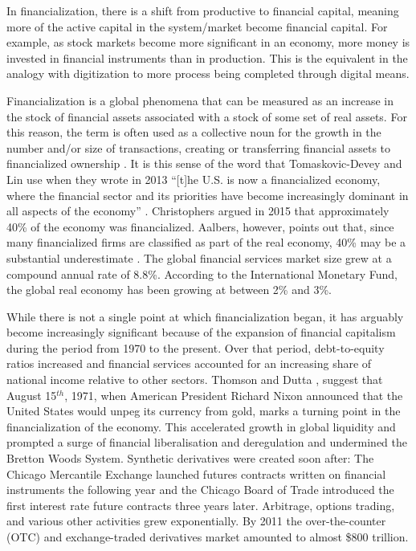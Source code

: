 In financialization, there is a shift from productive to financial capital, meaning more of the active capital in the system/market become financial capital. 
For example, as stock markets become more significant in an economy, more money is invested in financial instruments than in production. This is the equivalent in the analogy with digitization to more process being completed through digital means. 


Financialization is a global phenomena that can be measured as an increase in the stock of financial assets associated with a stock of some set of real assets. For this reason, the term is often used as a collective noun for the growth in the number and/or size of transactions, creating or transferring financial assets to financialized ownership \cite{GET_financialization-numberOfTransactions}. %
It is this sense of the word that Tomaskovic-Devey and Lin use when they wrote in 2013 ``[t]he U.S. is now a financialized economy, where the financial sector and its priorities have become increasingly dominant in all aspects of the economy'' \cite{tomaskovic-deveyFinancializationCausesInequality2013}. Christophers argued in 2015 that approximately 40\% of the economy was financialized. Aalbers, however, points out that, since many financialized firms are classified as part of the real economy, 40\% may be a substantial underestimate \cite{aalbersPotentialFinancialization2015}.  The global financial services market size grew at a compound annual rate of 8.8\%. According to the International Monetary Fund,  the global real economy has been growing at between 2\% and 3\%.

While there is not a single point at which financialization began, it has arguably become increasingly significant because of the expansion of financial capitalism during the period from 1970 to the present. Over that period,  debt-to-equity ratios increased and financial services accounted for an increasing share of national income relative to other sectors. Thomson and Dutta \cite{thomsonFinancialisationPrimer2018}, suggest that August 15$^{th}$, 1971, when American President Richard Nixon announced that the United States would unpeg its currency from gold, marks a turning point in the financialization of the economy. This accelerated growth in global liquidity and prompted a surge of financial liberalisation and deregulation and undermined the Bretton Woods System. Synthetic derivatives were created soon after: The Chicago Mercantile Exchange launched futures contracts written on financial instruments the following year and the Chicago Board of Trade introduced the first interest rate future contracts three years later. Arbitrage, options trading, and various other activities grew exponentially. By 2011 the over-the-counter (OTC) and exchange-traded derivatives market amounted to almost \$800 trillion. 

